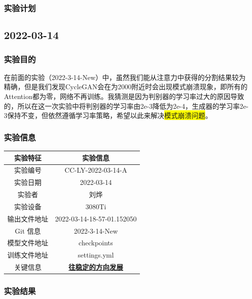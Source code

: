 \subsubsection{实验计划}

\newpage



\subsection{2022-03-14}\label{subsec:03-14}

\subsubsection{实验目的}

在前面的实验（2022-3-14-New）中，虽然我们能从注意力中获得的分割结果较为精确，但是我们发现CycleGAN会在为2000附近时会出现模式崩溃现象，即所有的Attention都为零，网络不再训练。我猜测是因为判别器的学习率过大的原因导致的，所以在这一次实验中将判别器的学习率由2e-3降低为2e-4，生成器的学习率2e-3保持不变，但依然遵循学习率策略，希望以此来解决\colorbox{yellow}{模式崩溃问题}。

\subsubsection{实验信息}


\begin{table}[H]
	\centering
	\begin{spacing}{1.5}
		\begin{tabular}{cc}\hline
			实验特征 & 实验信息 \\
			\hline
			实验编号 & CC-LY-2022-03-14-A\\
			实验日期 &  2022-03-14\\
			实验者 & 刘烨\\
			实验设备 & 3080Ti\\
			输出文件地址 & 2022-03-14-18-57-01.152050\\
			Git 信息 & 2022-3-14-New\\
			模型文件地址 & checkpoints\\
			训练文件地址 & settings.yml\\
			关键信息 & \underline{\textbf{往稳定的方向发展}}\\\hline
		\end{tabular}
	\end{spacing}
\end{table}


\subsubsection{实验结果}


